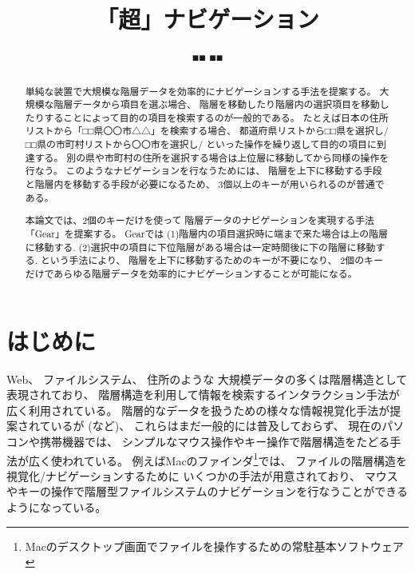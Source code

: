 \documentclass[twoside]{wiss}
\def\GEAR{\textsf{Gear}}
\begin{document}
\title{「超」ナビゲーション}
\etitle{} %

\author{■■ ■■}

\begin{abstract}
単純な装置で大規模な階層データを効率的にナビゲーションする手法を提案する。
%
大規模な階層データから項目を選ぶ場合、
階層を移動したり階層内の選択項目を移動したりすることによって目的の項目を検索するのが一般的である。
たとえば日本の住所リストから「□□県〇〇市△△」を検索する場合、
都道府県リストから□□県を選択し/□□県の市町村リストから〇〇市を選択し/
といった操作を繰り返して目的の項目に到達する。
別の県や市町村の住所を選択する場合は上位層に移動してから同様の操作を行なう。
%
このようなナビゲーションを行なうためには、
階層を上下に移動する手段と階層内を移動する手段が必要になるため、
3個以上のキーが用いられるのが普通である。

本論文では、2個のキーだけを使って
階層データのナビゲーションを実現する手法「{\GEAR}」を提案する。
{\GEAR}では
(1)階層内の項目選択時に端まで来た場合は上の階層に移動する.
(2)選択中の項目に下位階層がある場合は一定時間後に下の階層に移動する.
という手法により、
階層を上下に移動するためのキーが不要になり、
2個のキーだけであらゆる階層データを効率的にナビゲーションすることが可能になる。
\end{abstract}

\maketitle

\section{はじめに}

Web、
ファイルシステム、
住所のような
大規模データの多くは階層構造として表現されており、
階層構造を利用して情報を検索するインタラクション手法が広く利用されている。
階層的なデータを扱うための様々な情報視覚化手法が提案されているが
(\cite{Johnson:1991:TSA:949607.949654}\cite{Lamping:1995:FTB:223904.223956}\cite{Perlin:1993:PAA:166117.166125}\cite{Stasko:2000:FDN:857190.857683}など)、
これらはまだ一般的には普及しておらず、
現在のパソコンや携帯機器では、
シンプルなマウス操作やキー操作で階層構造をたどる手法が広く使われている。
%
例えばMacのファインダ\footnote{
  Macのデスクトップ画面でファイルを操作するための常駐基本ソフトウェア
}では、
ファイルの階層構造を視覚化/ナビゲーションするために
いくつかの手法が用意されており、
マウスやキーの操作で階層型ファイルシステムのナビゲーションを行なうことができるようになっている。
\end{document}
